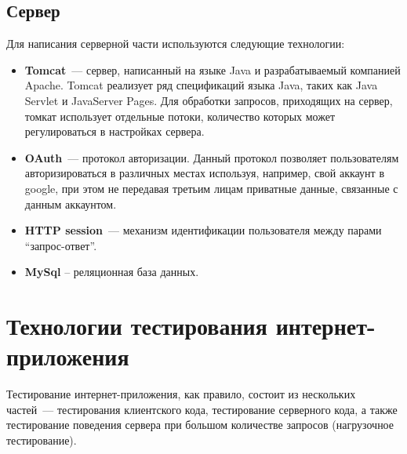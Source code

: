 \subsection{Сервер}
	Для написания серверной части используются следующие технологии:
\begin{itemize}
\item \textbf{Tomcat}\cite{tomcat}~--- сервер, написанный на языке Java и разрабатываемый компанией Apache. Tomcat реализует ряд спецификаций языка Java, таких как Java Servlet и JavaServer Pages. Для обработки запросов, приходящих на сервер, томкат использует отдельные потоки, количество которых может регулироваться в настройках сервера.
\item \textbf{OAuth}~--- протокол авторизации. Данный протокол позволяет пользователям авторизироваться в различных местах используя, например, свой аккаунт в google, при этом не передавая третьим лицам приватные данные, связанные с данным аккаунтом.
\item \textbf{HTTP session}~--- механизм идентификации пользователя между парами ``запрос-ответ''.
\item \textbf{MySql} -- реляционная база данных.
\end{itemize}
	
\section{Технологии тестирования интернет-прило\-же\-ния}
	Тестирование интернет-приложения, как правило, состоит из нескольких частей~--- тестирования клиентского кода, тестирование серверного кода, а также тестирование поведения сервера при большом количестве запросов (нагрузочное тестирование).
	
